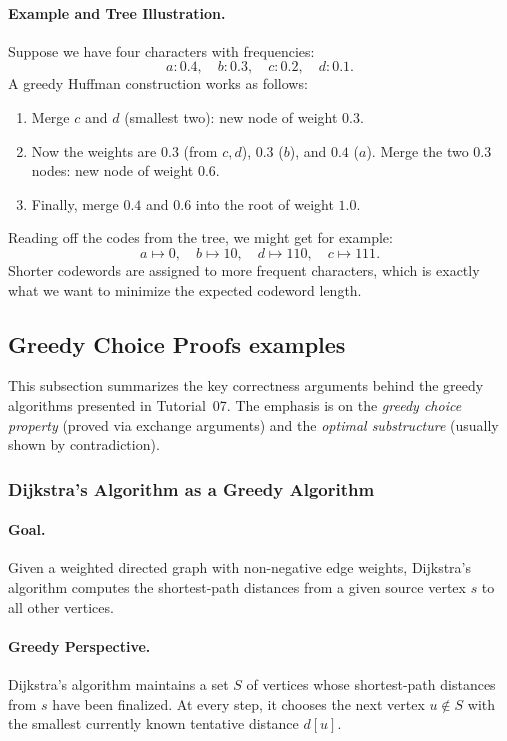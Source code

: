 \documentclass[9pt]{extarticle}
\begin{document}
\paragraph{Example and Tree Illustration.}
Suppose we have four characters with frequencies:
\[
    a: 0.4,\quad b: 0.3,\quad c: 0.2,\quad d: 0.1.
\]
A greedy Huffman construction works as follows:
\begin{enumerate}
    \item Merge \(c\) and \(d\) (smallest two): new node of weight \(0.3\).
    \item Now the weights are \(0.3\) (from \(c,d\)), \(0.3\) (\(b\)), and \(0.4\) (\(a\)).
          Merge the two \(0.3\) nodes: new node of weight \(0.6\).
    \item Finally, merge \(0.4\) and \(0.6\) into the root of weight \(1.0\).
\end{enumerate}


Reading off the codes from the tree, we might get for example:
\[
    a \mapsto 0,\quad
    b \mapsto 10,\quad
    d \mapsto 110,\quad
    c \mapsto 111.
\]
Shorter codewords are assigned to more frequent characters, which is exactly what
we want to minimize the expected codeword length.



\subsection{Greedy Choice Proofs examples}

This subsection summarizes the key correctness arguments behind the greedy
algorithms presented in Tutorial~07.  The emphasis is on the \emph{greedy choice
property} (proved via exchange arguments) and the \emph{optimal substructure}
(usually shown by contradiction).
\subsubsection{Dijkstra’s Algorithm as a Greedy Algorithm}

\paragraph{Goal.}
Given a weighted directed graph with non-negative edge weights, Dijkstra’s algorithm computes the shortest-path distances from a given source vertex \(s\) to all other vertices.

\paragraph{Greedy Perspective.}
Dijkstra’s algorithm maintains a set \(S\) of vertices whose shortest-path distances from \(s\) have been finalized. At every step, it chooses the next vertex \(u \notin S\) with the smallest currently known tentative distance \(d[u]\).
\end{document}
